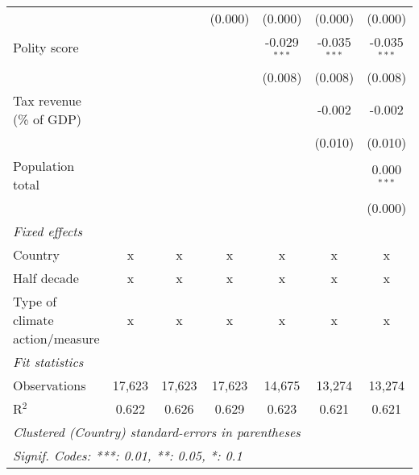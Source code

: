 \begin{tabular}{lcccccc}
                                                                                &         &                & (0.000)        & (0.000)        & (0.000)        & (0.000)\\   
   Polity score                                                                 &         &                &                & -0.029$^{***}$ & -0.035$^{***}$ & -0.035$^{***}$\\   
                                                                                &         &                &                & (0.008)        & (0.008)        & (0.008)\\   
   Tax revenue (\% of GDP)                                                      &         &                &                &                & -0.002         & -0.002\\   
                                                                                &         &                &                &                & (0.010)        & (0.010)\\   
   Population total                                                             &         &                &                &                &                & 0.000$^{***}$\\   
                                                                                &         &                &                &                &                & (0.000)\\   
   \emph{Fixed effects}\\
   Country                                                                      & x       & x              & x              & x              & x              & x\\  
   Half decade                                                                  & x       & x              & x              & x              & x              & x\\  
   Type of climate action/measure                                               & x       & x              & x              & x              & x              & x\\  
   \midrule \emph{Fit statistics}\\
   Observations                                                                 & 17,623  & 17,623         & 17,623         & 14,675         & 13,274         & 13,274\\  
   R$^2$                                                                        & 0.622   & 0.626          & 0.629          & 0.623          & 0.621          & 0.621\\  
   \midrule
   \multicolumn{7}{l}{\emph{Clustered (Country) standard-errors in parentheses}}\\
   \multicolumn{7}{l}{\emph{Signif. Codes: ***: 0.01, **: 0.05, *: 0.1}}\\
\end{tabular}
\par\endgroup


